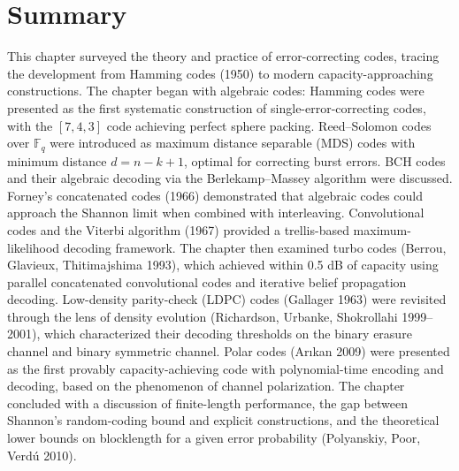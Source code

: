 \section{Summary}
\label{sec:ec:summary}

This chapter surveyed the theory and practice of error-correcting codes, tracing the development from Hamming codes (1950) to modern capacity-approaching constructions. The chapter began with algebraic codes: Hamming codes were presented as the first systematic construction of single-error-correcting codes, with the $[7,4,3]$ code achieving perfect sphere packing. Reed--Solomon codes over $\mathbb{F}_q$ were introduced as maximum distance separable (MDS) codes with minimum distance $d = n-k+1$, optimal for correcting burst errors. BCH codes and their algebraic decoding via the Berlekamp--Massey algorithm were discussed. Forney's concatenated codes (1966) demonstrated that algebraic codes could approach the Shannon limit when combined with interleaving. Convolutional codes and the Viterbi algorithm (1967) provided a trellis-based maximum-likelihood decoding framework. The chapter then examined turbo codes (Berrou, Glavieux, Thitimajshima 1993), which achieved within 0.5 dB of capacity using parallel concatenated convolutional codes and iterative belief propagation decoding. Low-density parity-check (LDPC) codes (Gallager 1963) were revisited through the lens of density evolution (Richardson, Urbanke, Shokrollahi 1999--2001), which characterized their decoding thresholds on the binary erasure channel and binary symmetric channel. Polar codes (Arıkan 2009) were presented as the first provably capacity-achieving code with polynomial-time encoding and decoding, based on the phenomenon of channel polarization. The chapter concluded with a discussion of finite-length performance, the gap between Shannon's random-coding bound and explicit constructions, and the theoretical lower bounds on blocklength for a given error probability (Polyanskiy, Poor, Verdú 2010).

